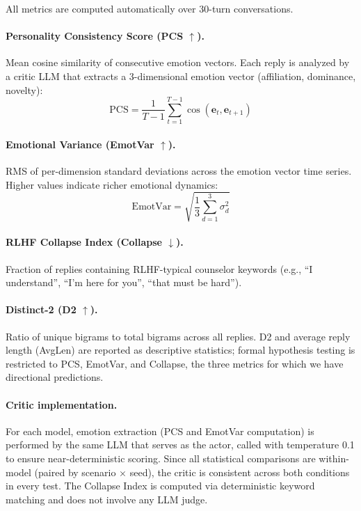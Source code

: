 All metrics are computed automatically over 30-turn conversations.

\paragraph{Personality Consistency Score (PCS $\uparrow$).} Mean cosine similarity of consecutive emotion vectors. Each reply is analyzed by a critic LLM that extracts a 3-dimensional emotion vector (affiliation, dominance, novelty):
\begin{equation}
    \text{PCS} = \frac{1}{T{-}1} \sum_{t=1}^{T-1} \cos(\mathbf{e}_t, \mathbf{e}_{t+1})
\end{equation}

\paragraph{Emotional Variance (EmotVar $\uparrow$).} RMS of per-dimension standard deviations across the emotion vector time series. Higher values indicate richer emotional dynamics:
\begin{equation}
    \text{EmotVar} = \sqrt{\frac{1}{3} \sum_{d=1}^{3} \sigma_d^2}
\end{equation}

\paragraph{RLHF Collapse Index (Collapse $\downarrow$).} Fraction of replies containing RLHF-typical counselor keywords (e.g., ``I understand'', ``I'm here for you'', ``that must be hard'').

\paragraph{Distinct-2 (D2 $\uparrow$).} Ratio of unique bigrams to total bigrams across all replies. D2 and average reply length (AvgLen) are reported as descriptive statistics; formal hypothesis testing is restricted to PCS, EmotVar, and Collapse, the three metrics for which we have directional predictions.

\paragraph{Critic implementation.} For each model, emotion extraction (PCS and EmotVar computation) is performed by the same LLM that serves as the actor, called with temperature 0.1 to ensure near-deterministic scoring. Since all statistical comparisons are within-model (paired by scenario $\times$ seed), the critic is consistent across both conditions in every test. The Collapse Index is computed via deterministic keyword matching and does not involve any LLM judge.


